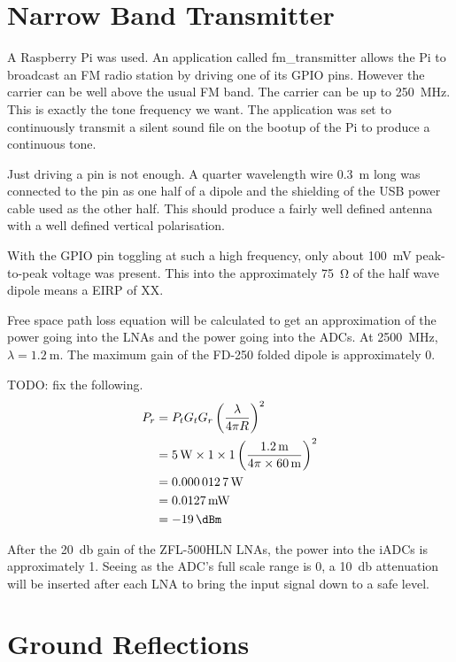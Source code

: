 \section{Narrow Band Transmitter}
A Raspberry Pi was used. An application called fm\_transmitter allows the Pi to broadcast an FM radio station by driving one of its GPIO pins. However the carrier can be well above the usual FM band. The carrier can be up to \SI{250}{\mega\hertz}. This is exactly the tone frequency we want. The application was set to continuously transmit a silent sound file on the bootup of the Pi to produce a continuous tone. 

Just driving a pin is not enough. A quarter wavelength wire \SI{0.3}{\metre} long was connected to the pin as one half of a dipole and the shielding of the USB power cable used as the other half. This should produce a fairly well defined antenna with a well defined vertical polarisation.

With the GPIO pin toggling at such a high frequency, only about \SI{100}{\milli\volt} peak-to-peak voltage was present. This into the approximately \SI{75}{\ohm} of the half wave dipole means a EIRP of XX.

Free space path loss equation will be calculated to get an approximation of the power going into the LNAs and the power going into the ADCs. At \SI{2500}{\mega\hertz}, \(\lambda = \SI{1.2}{\meter}\). The maximum gain of the FD-250 folded dipole is approximately \SI{0}{\dBi}.

TODO: fix the following.
\begin{align}
  P_r &= P_t G_t G_r \left( \frac{\lambda}{4 \pi R} \right)^2 \\
      &= \SI{5}{\watt} \times 1 \times 1 \left( \frac{\SI{1.2}{\meter}}{4 \pi \times \SI{60}{\meter}} \right)^2 \\
      &= \SI{0.0000127}{\watt} \\
      &= \SI{0.0127}{\milli\watt} \\
     &= \SI{-19}{\dBm}
\end{align}

After the \SI{20}{\decibel} gain of the ZFL-500HLN LNAs, the power into the iADCs is approximately \SI{1}{\dBm}. Seeing as the ADC's full scale range is \SI{0}{\dBm}, a \SI{10}{\decibel} attenuation will be inserted after each LNA to bring the input signal down to a safe level.

\section{Ground Reflections}

